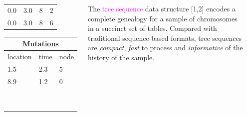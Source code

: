 \documentclass[25pt, a0paper, portrait, margin=0mm, innermargin=15mm,
     blockverticalspace=15mm, colspace=15mm, subcolspace=8mm]{tikzposter} %
\newcommand{\magenta}[1]{\textcolor{magenta}{#1}}
\begin{document}
\begin{columns}
{\begin{center}
{\begin{tabularx}{.10\textwidth}{p{1.5cm}p{1.5cm}p{2cm}X}
0.0 & 3.0 & 8 & 2\\
0.0 & 3.0 & 8 & 6 \\
\end{tabularx}\quad\quad\begin{tabularx}{.08\textwidth}{p{2.5cm}p{1.5cm}X}
\toprule
\multicolumn{3}{c}{{\bf Mutations}}\\
\midrule
location & time& node  \\
\midrule
1.5 & 2.3 & 5\\
8.9 & 1.2 & 0\\
 & &\\
 & &\\
 & &\\
 & &\\
 & &\\
 & &\\
 & &\\
 & & \\
 & & \\
 \end{tabularx}
}
\end{center}
\vspace{10mm}
The \magenta{tree sequence} data structure [1,2] encodes a complete genealogy for a sample of chromosomes in a succinct set of tables. Compared with traditional sequence-based formats, tree sequences are \emph{compact}, \emph{fast} to process and \emph{informative} of the history of the sample.
     }
     
\centering
  \begin{subcolumns}


\end{subcolumns}
\end{columns}
\end{document}
